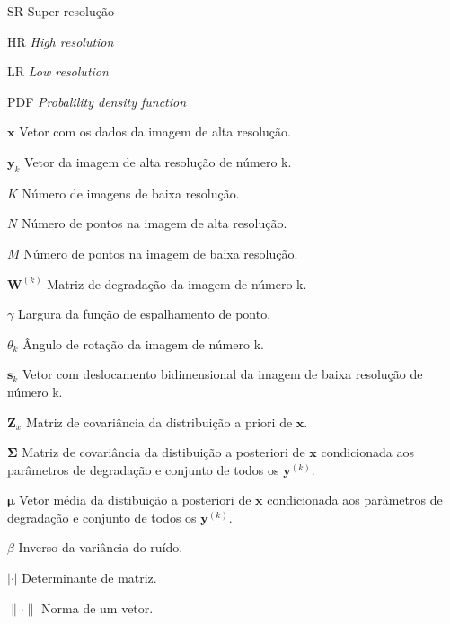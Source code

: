 \documentclass[12pt,openright,oneside,a4paper,english,brazil]{abntex2}
\begin{document}
\begin{siglas}
	\item[SR] Super-resolução
	\item[HR] \emph{High resolution}
	\item[LR] \emph{Low resolution}
	\item[PDF] \emph{Probalility density function}

\end{siglas}

\begin{simbolos}
	\item[$ \mathbf{x} $] Vetor com os dados da imagem de alta resolução.
	\item[$ \mathbf{y}_k $] Vetor da imagem de alta resolução de número k.
	\item[$ K $] Número de imagens de baixa resolução.
	\item[$ N $] Número de pontos na imagem de alta resolução.
    \item[$ M $] Número de pontos na imagem de baixa resolução.
    \item[$ \mathbf{W}^{(k)}$] Matriz de degradação da imagem de número k.
    \item[$ \gamma $] Largura da função de espalhamento de ponto.
    \item[$ \theta_k $] Ângulo de rotação da imagem de número k.
    \item[$ \mathbf{s}_k $] Vetor com deslocamento bidimensional da imagem de baixa resolução de número k.
    \item[$ \mathbf{Z}_x $] Matriz de covariância da distribuição a priori de $\mathbf{x}$.
    \item[$ \mathbf{\Sigma}$] Matriz de covariância da distibuição a posteriori de $\mathbf{x}$ condicionada aos parâmetros de degradação e conjunto de todos os $\mathbf{y}^{(k)}$.
    \item[$ \boldsymbol{\mu} $] Vetor média da distibuição a posteriori de $\mathbf{x}$ condicionada aos parâmetros de degradação e conjunto de todos os $\mathbf{y}^{(k)}$.
    \item[$ \beta $] Inverso da variância do ruído.
    \item[$ | \cdot | $] Determinante de matriz.
    \item[$\| \cdot \|$] Norma de um vetor.
    
\end{simbolos}
\end{document}
